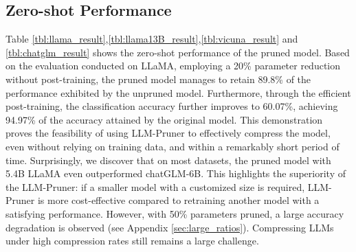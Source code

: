 \subsection{Zero-shot Performance}

Table \ref{tbl:llama_result},\ref{tbl:llama13B_result},\ref{tbl:vicuna_result} and \ref{tbl:chatglm_result} shows the zero-shot performance of the pruned model. 
Based on the evaluation conducted on LLaMA, employing a 20\% parameter reduction without post-training, the pruned model manages to retain 89.8\% of the performance exhibited by the unpruned model. Furthermore, through the efficient post-training, the classification accuracy further improves to 60.07\%, achieving 94.97\% of the accuracy attained by the original model. This demonstration proves the feasibility of using LLM-Pruner to effectively compress the model, even without relying on training data, and within a remarkably short period of time. 
Surprisingly, we discover that on most datasets, the pruned model with 5.4B LLaMA even outperformed chatGLM-6B. This highlights the superiority of the LLM-Pruner: if a smaller model with a customized size is required, LLM-Pruner is more cost-effective compared to retraining another model with a satisfying performance.
However, with 50\% parameters pruned, a large accuracy degradation is observed (see Appendix \ref{sec:large_ratios}). Compressing LLMs under high compression rates still remains a large challenge.


